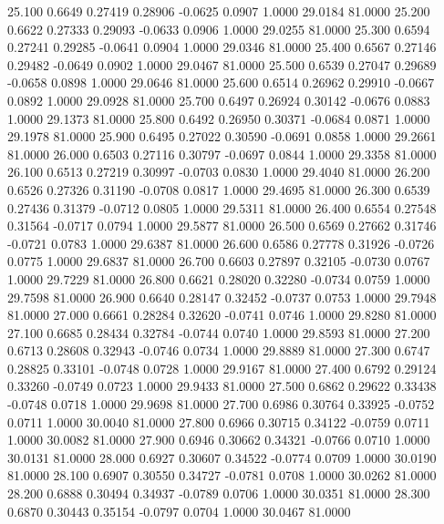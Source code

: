   25.100   0.6649   0.27419   0.28906  -0.0625   0.0907   1.0000  29.0184  81.0000
  25.200   0.6622   0.27333   0.29093  -0.0633   0.0906   1.0000  29.0255  81.0000
  25.300   0.6594   0.27241   0.29285  -0.0641   0.0904   1.0000  29.0346  81.0000
  25.400   0.6567   0.27146   0.29482  -0.0649   0.0902   1.0000  29.0467  81.0000
  25.500   0.6539   0.27047   0.29689  -0.0658   0.0898   1.0000  29.0646  81.0000
  25.600   0.6514   0.26962   0.29910  -0.0667   0.0892   1.0000  29.0928  81.0000
  25.700   0.6497   0.26924   0.30142  -0.0676   0.0883   1.0000  29.1373  81.0000
  25.800   0.6492   0.26950   0.30371  -0.0684   0.0871   1.0000  29.1978  81.0000
  25.900   0.6495   0.27022   0.30590  -0.0691   0.0858   1.0000  29.2661  81.0000
  26.000   0.6503   0.27116   0.30797  -0.0697   0.0844   1.0000  29.3358  81.0000
  26.100   0.6513   0.27219   0.30997  -0.0703   0.0830   1.0000  29.4040  81.0000
  26.200   0.6526   0.27326   0.31190  -0.0708   0.0817   1.0000  29.4695  81.0000
  26.300   0.6539   0.27436   0.31379  -0.0712   0.0805   1.0000  29.5311  81.0000
  26.400   0.6554   0.27548   0.31564  -0.0717   0.0794   1.0000  29.5877  81.0000
  26.500   0.6569   0.27662   0.31746  -0.0721   0.0783   1.0000  29.6387  81.0000
  26.600   0.6586   0.27778   0.31926  -0.0726   0.0775   1.0000  29.6837  81.0000
  26.700   0.6603   0.27897   0.32105  -0.0730   0.0767   1.0000  29.7229  81.0000
  26.800   0.6621   0.28020   0.32280  -0.0734   0.0759   1.0000  29.7598  81.0000
  26.900   0.6640   0.28147   0.32452  -0.0737   0.0753   1.0000  29.7948  81.0000
  27.000   0.6661   0.28284   0.32620  -0.0741   0.0746   1.0000  29.8280  81.0000
  27.100   0.6685   0.28434   0.32784  -0.0744   0.0740   1.0000  29.8593  81.0000
  27.200   0.6713   0.28608   0.32943  -0.0746   0.0734   1.0000  29.8889  81.0000
  27.300   0.6747   0.28825   0.33101  -0.0748   0.0728   1.0000  29.9167  81.0000
  27.400   0.6792   0.29124   0.33260  -0.0749   0.0723   1.0000  29.9433  81.0000
  27.500   0.6862   0.29622   0.33438  -0.0748   0.0718   1.0000  29.9698  81.0000
  27.700   0.6986   0.30764   0.33925  -0.0752   0.0711   1.0000  30.0040  81.0000
  27.800   0.6966   0.30715   0.34122  -0.0759   0.0711   1.0000  30.0082  81.0000
  27.900   0.6946   0.30662   0.34321  -0.0766   0.0710   1.0000  30.0131  81.0000
  28.000   0.6927   0.30607   0.34522  -0.0774   0.0709   1.0000  30.0190  81.0000
  28.100   0.6907   0.30550   0.34727  -0.0781   0.0708   1.0000  30.0262  81.0000
  28.200   0.6888   0.30494   0.34937  -0.0789   0.0706   1.0000  30.0351  81.0000
  28.300   0.6870   0.30443   0.35154  -0.0797   0.0704   1.0000  30.0467  81.0000
